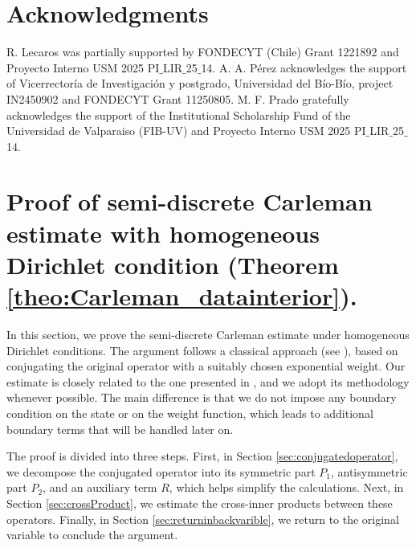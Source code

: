 \documentclass[11pt,oneside,leqno]{amsart}
\numberwithin{equation}{section}
\numberwithin{equation}{section}
\begin{document}
\section*{Acknowledgments}
 R. Lecaros was partially supported by FONDECYT (Chile) Grant 1221892 and Proyecto Interno USM 2025 PI$\_$LIR$\_$25$\_$14. A. A. P\'erez acknowledges the support of Vicerrector\'ia de Investigaci\'on y postgrado, Universidad del B\'io-B\'io, project IN2450902 and FONDECYT Grant 11250805. M. F. Prado gratefully acknowledges the support of the Institutional Scholarship Fund of the Universidad de Valparaiso (FIB-UV) and Proyecto Interno USM 2025 PI$\_$LIR$\_$25$\_$14.
\appendix
\section{Proof of semi-discrete Carleman estimate with homogeneous Dirichlet condition (Theorem \ref{theo:Carleman_datainterior}).}\label{Proof:CarlemanEstimateHomegeneuos}
In this section, we prove the semi-discrete Carleman estimate under homogeneous Dirichlet conditions. The argument follows a classical approach (see \cite{fursikov-1996}), based on conjugating the original operator with a suitably chosen exponential weight. Our estimate is closely related to the one presented in \cite{boyer-2010-1d-elliptic}, and we adopt its methodology whenever possible. The main difference is that we do not impose any boundary condition on the state or on the weight function, which leads to additional boundary terms that will be handled later on.

The proof is divided into three steps. First, in Section \ref{sec:conjugatedoperator}, we decompose the conjugated operator into its symmetric part $P_{1}$, antisymmetric part $P_{2}$, and an auxiliary term $R$, which helps simplify the calculations. Next, in Section \ref{sec:crossProduct}, we estimate the cross-inner products between these operators. Finally, in Section \ref{sec:returninbackvarible}, we return to the original variable to conclude the argument.
\end{document}
